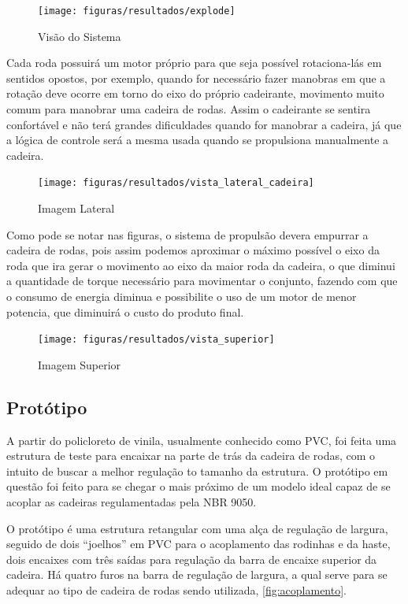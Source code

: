 \begin{figure}[!htb]
\centering
\texttt{[image: figuras/resultados/explode]}
\caption{Visão do Sistema}
\label{fig:sistema}
\end{figure}

Cada roda possuirá um motor próprio para que seja possível rotaciona-lás em sentidos opostos, por exemplo, quando for necessário fazer manobras em que a rotação deve ocorre em torno do eixo do próprio cadeirante, movimento muito comum para manobrar uma cadeira de rodas. Assim o cadeirante se sentira confortável e não terá grandes dificuldades quando for manobrar a cadeira, já que a lógica de controle será a mesma usada quando se propulsiona manualmente a cadeira.

\begin{figure}[!htb]
\centering
\texttt{[image: figuras/resultados/vista\_lateral\_cadeira]}
\caption{Imagem Lateral}
\label{fig:lateral}
\end{figure}

Como pode se notar nas figuras, o sistema de propulsão devera empurrar a cadeira de rodas, pois assim podemos aproximar o máximo possível o eixo da roda que ira gerar o movimento ao eixo da maior roda da cadeira, o que diminui a quantidade de torque necessário para movimentar o conjunto, fazendo com que o consumo de energia diminua e possibilite o uso de um motor de menor potencia, que diminuirá o custo do produto final.

\begin{figure}[!htb]
\centering
\texttt{[image: figuras/resultados/vista\_superior]}
\caption{Imagem Superior}
\label{fig:superior}
\end{figure}

\subsection{Protótipo}

A partir do policloreto de vinila, usualmente conhecido como PVC, foi feita uma estrutura de teste para encaixar na parte de trás da cadeira de rodas, com o intuito de buscar a melhor regulação to tamanho da estrutura. O protótipo em questão foi feito para se chegar o mais próximo de um modelo ideal capaz de se acoplar as cadeiras regulamentadas pela NBR 9050.

O protótipo é uma estrutura retangular com uma alça de regulação de largura, seguido de dois “joelhos” em PVC para o acoplamento das rodinhas e da haste, dois encaixes com três saídas para regulação da barra de encaixe superior da cadeira. Há quatro furos na barra de regulação de largura, a qual serve para se adequar ao tipo de cadeira de rodas sendo utilizada, \ref{fig:acoplamento}.

